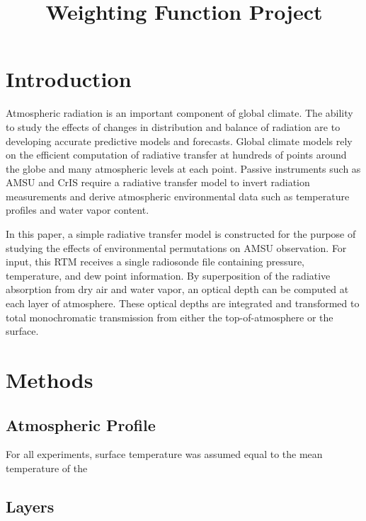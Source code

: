 \documentclass[twocol]{ametsoc}
\title{Weighting Function Project}
\affiliation{University of Wisconsin - Madison}
\begin{document}
\maketitle


%
\section{Introduction}

Atmospheric radiation is an important component of global climate.
The ability to study the effects of changes in distribution and balance of radiation are to developing accurate predictive models and forecasts.
Global climate models rely on the efficient computation of radiative transfer at hundreds of points around the globe and many atmospheric levels at each point.
Passive instruments such as AMSU and CrIS require a radiative transfer model to invert radiation measurements and derive atmospheric environmental data such as temperature profiles and water vapor content.
\par In this paper, a simple radiative transfer model is constructed for the purpose of studying the effects of environmental permutations on AMSU observation.
For input, this RTM receives a  single radiosonde file containing pressure, temperature, and dew point information.
By superposition of the radiative absorption from dry air and water vapor, an optical depth can be computed at each layer of atmosphere.
These optical depths are integrated and transformed to total monochromatic transmission from either the top-of-atmosphere or the surface.

\section{Methods}

\subsection{Atmospheric Profile}

For all experiments, surface temperature was assumed equal to the mean temperature of the 

\subsection{Layers}
\end{document}
